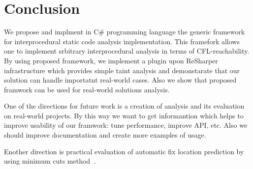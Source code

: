 \section{Conclusion}

We propose and implment in C\# programming language the generic framework for interprocedural static code analysis implementation.
This framefork allows one to implement srbitrary interprocedural analysis in terms of CFL-reachability.
By using proposed framework, we implement a plugin upon ReSharper infrastructure which provides simple taint analysis and demonstarate that our solution can handle importatnt real-world cases.
Also we show that proposed framwork can be used for real-world solutions analysis.

One of the directions for future work is a creation of analysis and its evaluation on real-world projects.
By this way we want to get informantion which helps to improve usability of our framwork: tune performance, improve API, etc.
Also we should improve documentation and create more examples of usage.

Enother direction is practical evaluation of automatic fix location prediction by using minimum cuts method~\cite{10.1007/978-3-319-63390-9_27}.
